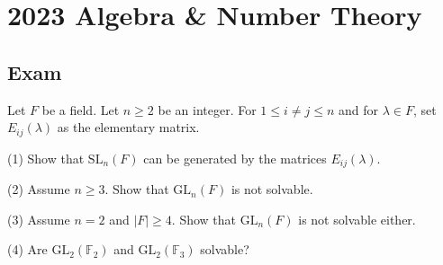 \section{2023 Algebra \& Number Theory}

\subsection*{Exam}
\begin{exercise}
\label{algebra:2023:1}
Let $F$ be a field. Let $n \geq 2$ be an integer. For $1 \leq i \neq j \leq n$ and for $\lambda \in F$, set $E_{ij}(\lambda)$ as the elementary matrix.

(1) Show that $\mathrm{SL}_n(F)$ can be generated by the matrices $E_{ij}(\lambda)$.

(2) Assume $n \geq 3$. Show that $\mathrm{GL}_n(F)$ is not solvable.

(3) Assume $n = 2$ and $|F| \geq 4$. Show that $\mathrm{GL}_n(F)$ is not solvable either.

(4) Are $\mathrm{GL}_2(\mathbb{F}_2)$ and $\mathrm{GL}_2(\mathbb{F}_3)$ solvable?
\end{exercise}

